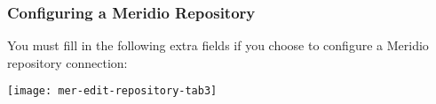 %
%

\subsubsection{Configuring a Meridio Repository}

You must fill in the following extra fields if you choose to
configure a Meridio repository connection: 

\texttt{[image: mer-edit-repository-tab3]}


